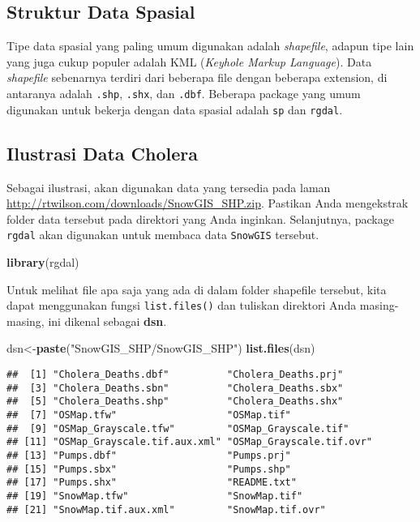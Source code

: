 \documentclass[
]{book}
\newenvironment{Shaded}{\begin{snugshade}}{\end{snugshade}}
\newcommand{\KeywordTok}[1]{\textcolor[rgb]{0.13,0.29,0.53}{\textbf{#1}}}
\newcommand{\NormalTok}[1]{#1}
\newcommand{\StringTok}[1]{\textcolor[rgb]{0.31,0.60,0.02}{#1}}
\begin{document}
\hypertarget{struktur-data-spasial}{%
\subsection{Struktur Data Spasial}\label{struktur-data-spasial}}

Tipe data spasial yang paling umum digunakan adalah \emph{shapefile}, adapun tipe lain yang juga cukup populer adalah KML (\emph{Keyhole Markup Language}). Data \emph{shapefile} sebenarnya terdiri dari beberapa file dengan beberapa extension, di antaranya adalah \texttt{.shp}, \texttt{.shx}, dan \texttt{.dbf}. Beberapa package yang umum digunakan untuk bekerja dengan data spasial adalah \texttt{sp} dan \texttt{rgdal}.

\hypertarget{ilustrasi-data-cholera}{%
\subsection{Ilustrasi Data Cholera}\label{ilustrasi-data-cholera}}

Sebagai ilustrasi, akan digunakan data yang tersedia pada laman \url{http://rtwilson.com/downloads/SnowGIS_SHP.zip}. Pastikan Anda mengekstrak folder data tersebut pada direktori yang Anda inginkan. Selanjutnya, package \texttt{rgdal} akan digunakan untuk membaca data \texttt{SnowGIS} tersebut.

\begin{Shaded}
\begin{Highlighting}[]
\KeywordTok{library}\NormalTok{(rgdal)}
\end{Highlighting}
\end{Shaded}

Untuk melihat file apa saja yang ada di dalam folder shapefile tersebut, kita dapat menggunakan fungsi \texttt{list.files()} dan tuliskan direktori Anda masing-masing, ini dikenal sebagai \textbf{dsn}.

\begin{Shaded}
\begin{Highlighting}[]
\NormalTok{dsn\textless{}{-}}\KeywordTok{paste}\NormalTok{(}\StringTok{"SnowGIS\_SHP/SnowGIS\_SHP"}\NormalTok{)}
\KeywordTok{list.files}\NormalTok{(dsn)}
\end{Highlighting}
\end{Shaded}

\begin{verbatim}
##  [1] "Cholera_Deaths.dbf"          "Cholera_Deaths.prj"         
##  [3] "Cholera_Deaths.sbn"          "Cholera_Deaths.sbx"         
##  [5] "Cholera_Deaths.shp"          "Cholera_Deaths.shx"         
##  [7] "OSMap.tfw"                   "OSMap.tif"                  
##  [9] "OSMap_Grayscale.tfw"         "OSMap_Grayscale.tif"        
## [11] "OSMap_Grayscale.tif.aux.xml" "OSMap_Grayscale.tif.ovr"    
## [13] "Pumps.dbf"                   "Pumps.prj"                  
## [15] "Pumps.sbx"                   "Pumps.shp"                  
## [17] "Pumps.shx"                   "README.txt"                 
## [19] "SnowMap.tfw"                 "SnowMap.tif"                
## [21] "SnowMap.tif.aux.xml"         "SnowMap.tif.ovr"
\end{verbatim}
\end{document}
